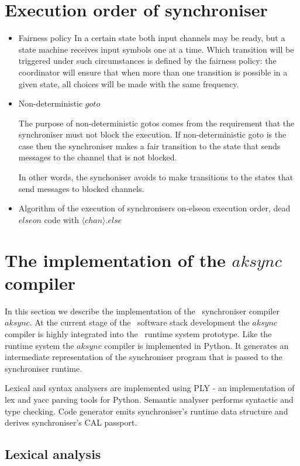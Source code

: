 \section{Execution order of synchroniser\label{execod}}
\begin{itemize}
\item Fairness policy
In a certain state both input channels may be ready, but a state machine receives input symbols one at a time. Which transition will be triggered under such circumstances is defined by the fairness policy: the coordinator will ensure that when more than one transition is possible in a given state, all choices will be made with the same frequency.

\item Non-deterministic $goto$

The purpose of non-deterministic gotos comes from the requirement that the synchroniser must not block the execution. If non-deterministic goto is the case then the synchroniser makes a fair transition to the state that sends messages to the channel that is not blocked.

In other words, the synchoniser avoids to make transitions to the states that send messages to blocked channels.


\item Algorithm of the execution of synchronisers
on-elseon execution order, dead $elseon$ code with $\langle chan \rangle .else$
\end{itemize}


\section{The implementation of the $aksync$ compiler}
In this section we describe the implementation of the \ak\ synchroniser compiler $aksync$. At the current stage of the \ak\ software stack development the $aksync$ compiler is highly integrated into the \ak\ runtime system prototype. Like the runtime system the $aksync$ compiler is implemented in Python. It generates an intermediate representation of the synchroniser program that is passed to the synchroniser runtime.

Lexical and syntax analysers are implemented using PLY \cite{ply} - an implementation of lex and yacc parsing tools for Python. Semantic analyser performs syntactic and type checking. Code generator emits synchroniser's runtime data structure and derives synchroniser's CAL passport.


\subsection{Lexical analysis}
